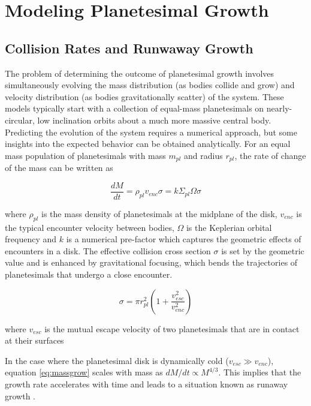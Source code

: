 \section{Modeling Planetesimal Growth}

\subsection{Collision Rates and Runwaway Growth}

The problem of determining the outcome of planetesimal growth involves simultaneously evolving the mass distribution (as bodies collide and grow) and velocity distribution (as bodies gravitationally scatter) of the system. These models typically start with a collection of equal-mass planetesimals on nearly-circular, low inclination orbits about a much more massive central body. Predicting the evolution of the system requires a numerical approach, but some insights into the expected behavior can be obtained analytically. For an equal mass population of planetesimals with mass $m_{pl}$ and radius $r_{pl}$, the rate of change of the mass can be written as

\begin{equation}\label{eq:massgrow}
	\frac{dM}{dt} = \rho_{pl} v_{enc} \sigma = k \Sigma_{pl} \Omega \sigma
\end{equation}

\noindent where $\rho_{pl}$ is the mass density of planetesimals at the midplane of the disk, $v_{enc}$ is the typical encounter velocity between bodies, $\Omega$ is the Keplerian orbital frequency and $k$ is a numerical pre-factor which captures the geometric effects of encounters in a disk. The effective collision cross section $\sigma$ is set by the geometric value and is enhanced by gravitational focusing, which bends the trajectories of planetesimals that undergo a close encounter.

\begin{equation}\label{eq:gf}
	\sigma = \pi r_{pl}^2 \left( 1 + \frac{v_{esc}^2}{v_{enc}^2} \right)
\end{equation}

\noindent where $v_{esc}$ is the mutual escape velocity of two planetesimals that are in contact at their surfaces

In the case where the planetesimal disk is dynamically cold ($v_{esc} \gg v_{enc}$), equation \ref{eq:massgrow} scales with mass as $dM/dt \propto M^{4/3}$. This implies that the growth rate accelerates with time and leads to a situation known as runaway growth \cite{wetherill89, kokubo96}.

